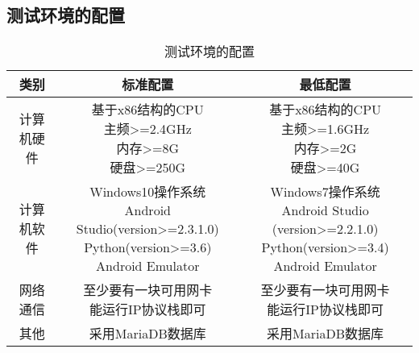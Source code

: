 \subsection{测试环境的配置}
\begin{table}[htbp]
\centering
\caption{测试环境的配置} \label{tab:test-environment}
\begin{tabular}{|c|c|c|}
       \hline
    类别 & 标准配置 & 最低配置 \\
    \hline
    计算机硬件 & \tabincell{c}{基于x86结构的CPU\\ 主频>=2.4GHz\\ 内存>=8G\\ 硬盘>=250G} & \tabincell{c}{基于x86结构的CPU\\ 主频>=1.6GHz\\ 内存>=2G\\ 硬盘>=40G} \\
    \hline
    计算机软件 & \tabincell{c}{Windows10操作系统\\Android Studio(version>=2.3.1.0)\\Python(version>=3.6)\\Android Emulator} & \tabincell{c}{Windows7操作系统\\Android Studio (version>=2.2.1.0)\\Python(version>=3.4)\\Android Emulator}\\ 
    \hline
    网络通信 & \tabincell{c}{至少要有一块可用网卡\\ 能运行IP协议栈即可} & \tabincell{c}{至少要有一块可用网卡\\ 能运行IP协议栈即可} \\
    \hline
    其他 & 采用MariaDB数据库 & 采用MariaDB数据库 \\
    \hline
\end{tabular}
\end{table}

